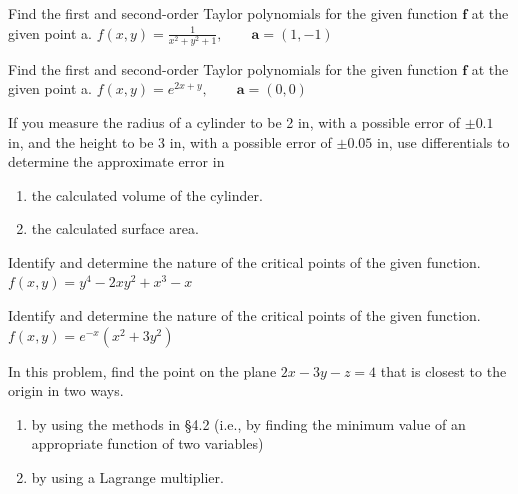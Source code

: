 \documentclass[12pt,letterpaper]{hmcpset}
\newcommand{\vb}{\mathbf}
\begin{document}

\begin{problem}[Colley 4.1.9]
Find the first and second-order Taylor polynomials for the given function $\vb f$ at the given point a.
$f(x,y)= \frac{1}{x^2 +y^2 + 1},\qquad \vb a=(1,-1)$
\end{problem}
\clearpage

\begin{problem}[Colley 4.1.10]
Find the first and second-order Taylor polynomials for the given function $\vb f$ at the given point a.
$f(x,y)=e^{2x+y},\qquad \vb a=(0,0)$
\end{problem}
\clearpage

\begin{problem}[Colley 4.1.36]
  If you measure the radius of a cylinder to be 2 in, with a possible error of $\pm{0.1}$ in, and the height to be 3 in, with a possible error of $\pm{0.05}$ in, use differentials to determine the approximate error in
  \begin{enumerate}[label=(\alph*)]
  \item the calculated volume of the cylinder.
  \item the calculated surface area.
\end{enumerate}
\end{problem}
\clearpage

\begin{problem}[Colley 4.2.6]
Identify and determine the nature of the critical points of the given function.
$f(x,y)=y^4-2xy^2+x^3-x$
\end{problem}
\clearpage

\begin{problem}[Colley 4.2.12]
Identify and determine the nature of the critical points of the given function.
$f(x,y)=e^{-x}(x^2 +3y^2)$
\end{problem}
\clearpage

\begin{problem}[Colley 4.3.1]
  In this problem, find the point on the plane $2x - 3y - z = 4$ that is closest to the origin in two ways.
  \begin{enumerate}[label=(\alph*)]
  \item by using the methods in §4.2 (i.e., by finding the
minimum value of an appropriate function of two variables)\\
  \item by using a Lagrange multiplier.
  \end{enumerate}
\end{problem}
\clearpage
\end{document}

